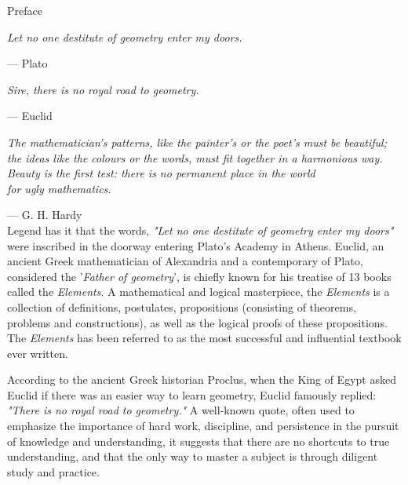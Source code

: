 \documentclass[twoside,11pt]{report}
\begin{document}
\centerline{\LARGE{Preface}}

\hfill

\normalsize %


\hspace{2em}\textit{Let no one destitute of geometry enter my doors.}

\hspace{16em} --- Plato

\hfill

\begin{center}
  \textit{Sire, there is no royal road to geometry.}

  \hspace{10.5em}--- Euclid
\end{center}

\hfill

\begin{flushright}
  \textit{The mathematician's patterns, like the painter's or the poet's must be beautiful;}
  \textit{the ideas like the colours or the words, must fit together in a harmonious way.}
  \textit{Beauty is the first test: there is no permanent place in the world}\\
  \textit{for ugly mathematics.}
\end{flushright}

\hfill --- G. H. Hardy\\

Legend has it that the words, \textit{"Let no one destitute of geometry enter my doors"} were inscribed in the doorway entering Plato's Academy in Athens.  Euclid, an ancient Greek mathematician of Alexandria and a contemporary of Plato, considered the '\textit{Father of geometry}', is chiefly known for his treatise of 13 books called the \textit{Elements}.  A mathematical and logical masterpiece, the \textit{Elements} is a collection of definitions, postulates, propositions (consisting of theorems, problems and constructions), as well as the logical proofs of these propositions.  The \textit{Elements} has been referred to as the most successful and influential textbook ever written.

According to the ancient Greek historian Proclus, when the King of Egypt asked Euclid if there was an easier way to learn geometry, Euclid famously replied: \textit{"There is no royal road to geometry."} A well-known quote, often used to emphasize the importance of hard work, discipline, and persistence in the pursuit of knowledge and understanding, it suggests that there are no shortcuts to true understanding, and that the only way to master a subject is through diligent study and practice.
\end{document}
